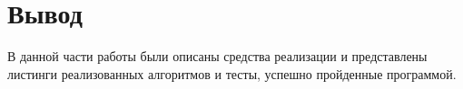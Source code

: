 \section*{Вывод}

В данной части работы были описаны средства реализации и представлены листинги реализованных алгоритмов и тесты, успешно пройденные программой.